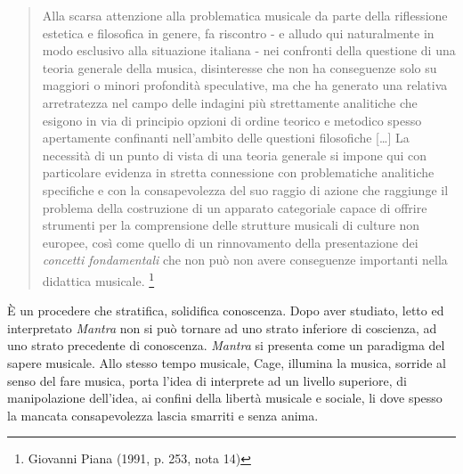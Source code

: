 \documentclass[
	a4paper,
	twocolumn
	]{article}
\begin{document}
\begin{quote}
	Alla scarsa attenzione alla problematica musicale da parte della riflessione estetica e filosofica in genere, fa riscontro - e alludo qui naturalmente in modo esclusivo alla situazione italiana - nei confronti della questione di una teoria generale della musica, disinteresse che non ha conseguenze solo su maggiori o minori profondità speculative, ma che ha generato una relativa arretratezza nel campo delle indagini pi\`u strettamente analitiche che esigono in via di principio opzioni di ordine teorico e metodico spesso apertamente confinanti nell'ambito delle questioni filosofiche [\ldots] La necessità di un punto di vista di una teoria generale si impone qui con particolare evidenza in stretta connessione con problematiche analitiche specifiche e con la consapevolezza del suo raggio di azione che raggiunge il problema della costruzione di un apparato categoriale capace di offrire strumenti per la comprensione delle strutture musicali di culture non europee, così come quello di un  rinnovamento della presentazione dei \emph{concetti fondamentali} che non può non avere conseguenze importanti nella didattica musicale. \footnote{Giovanni Piana (1991, p. 253, nota 14)}
\end{quote}

È un procedere che stratifica, solidifica conoscenza. Dopo aver studiato, letto ed interpretato \emph{Mantra} non si può tornare ad uno strato inferiore di coscienza, ad uno strato precedente di conoscenza. \emph{Mantra} si presenta come un paradigma del sapere musicale. Allo stesso tempo musicale, Cage, illumina la musica, sorride al senso del fare musica, porta l'idea di interprete ad un livello superiore, di manipolazione dell'idea, ai confini della libertà musicale e sociale, li dove spesso la mancata consapevolezza lascia smarriti e senza anima.
\end{document}
